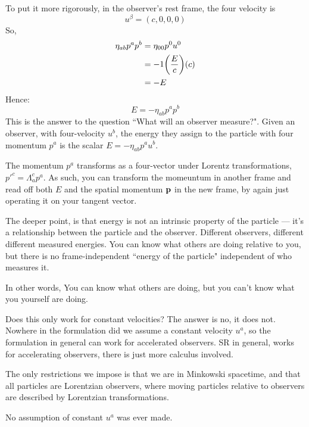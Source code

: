 			To put it more rigorously, in the observer's rest frame, the 
			four velocity is
			\[
				u^\beta = (c, 0, 0 ,0)
			\]
			So, 
			\begin{align*}
				\eta_{ab} p^a p^b 
				&= \eta_{00} p^0 u^0\\
				&= -1 \qty(\frac{E}{c}) (c)\\
				&= - E
			\end{align*}
			Hence:
			\[
				E = -\eta_{ab}p^a p^b
			\]
			This is the answer to the question ``What will an observer measure?".
			Given an observer, with four-velocity $u^b$, the energy they assign
			to the particle with four momentum $p^a$ is the scalar $E = -\eta_{ab} p^a u^b$.

			The momentum $p^a$ transforms as a four-vector under Lorentz transformations, $p'^c = \Lambda^c_a p^a$.
			As such, you can transform the momeuntum in another frame and read off both $E$ and the 
			spatial momentum $\vb{p}$ in the new frame, by again just operating it on your tangent vector.

			The deeper point, is that energy is not an intrinsic property of the particle — it's a relationship between 
			the particle and the observer. Different observers, different 
			different measured energies. You can know what others are doing relative to you, 
			but there is no frame-independent ``energy of the particle" independent of who measures it.	
		
			In other words,
			You can know what others are doing, but you can't know what you yourself 
			are doing.
			\begin{question}{Does this only work for constant velocities?}
				The answer is no, it does not. Nowhere in the formulation
				did we assume a constant velocity $u^a$, so the formulation
				in general can work
				for accelerated observers. SR in general, works for accelerating
				observers, there is just more calculus involved.

				\hspace{1em}
				The only restrictions we impose is that we are in Minkowski 
				spacetime, and that all particles are Lorentzian observers,
				where moving particles relative to observers are described
				by Lorentzian transformations.

				\hspace{1em}
				No assumption of constant $u^a$ was ever made.
			\end{question}
			
